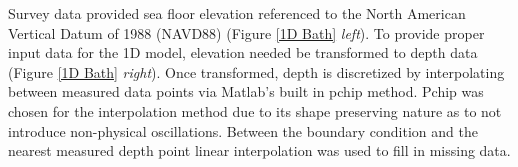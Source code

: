 	Survey data provided sea floor elevation referenced to the North American Vertical Datum of 1988 (NAVD88) (Figure \ref{1D Bath} \textit{left}). To provide proper input data for the 1D model, elevation needed be transformed to depth data (Figure \ref{1D Bath} \textit{right}). Once transformed, depth is discretized by interpolating between measured data points via Matlab's built in pchip method. Pchip was chosen for the interpolation method due to its shape preserving nature as to not introduce non-physical oscillations. Between the boundary condition and the nearest measured depth point linear interpolation was used to fill in missing data.